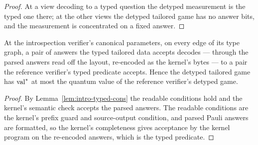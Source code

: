 \begin{proof}
\leanok
At a view decoding to a typed question the detyped measurement is the typed one there; at the
other views the detyped tailored game has no answer bits, and the measurement is concentrated on
a fixed answer.
\end{proof}

\begin{lemma}
\label{lem:intro-presentation-sound}
\leanok
At the introspection verifier's canonical parameters, on every edge of its type graph, a pair of
answers the typed tailored data accepts decodes --- through the parsed answers read off the
layout, re-encoded as the kernel's bytes --- to a pair the reference verifier's typed predicate
accepts. Hence the detyped tailored game has $\mathrm{val}^*$ at most the quantum value of the reference
verifier's detyped game.
\end{lemma}

\begin{proof}
\leanok
By Lemma~\ref{lem:intro-typed-cons} the readable conditions hold and the kernel's semantic check
accepts the parsed answers. The readable conditions are the kernel's prefix guard and source-output
condition, and parsed Pauli answers are formatted, so the kernel's completeness gives acceptance
by the kernel program on the re-encoded answers, which is the typed predicate.
\end{proof}

